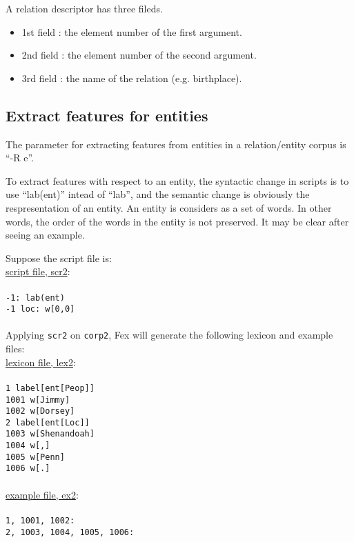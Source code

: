 \documentclass[11pt]{article}
\begin{document}
A relation descriptor has three fileds.
\begin{itemize}
  \item 1st field : the element number of the first argument.
  \item 2nd field : the element number of the second argument.
  \item 3rd field : the name of the relation (e.g. birthplace).
\end{itemize}

\subsection*{Extract features for entities}

The parameter for extracting features from entities in a relation/entity corpus is ``-R e''.

To extract features with respect to an entity, the syntactic change in
scripts is to use ``lab(ent)'' intead of ``lab'', and 
the semantic change is obviously the respresentation of an entity.  An entity
is considers as a set of words.  In other words, the order of the words in
the entity is not preserved.  It may be clear after seeing an example.

Suppose the script file is: \\

\underline{script file, scr2}: \\ \\
{\tt -1: lab(ent) \\
-1 loc: w[0,0]} \\ \\

Applying {\tt scr2} on {\tt corp2}, Fex will generate the following
lexicon and example files: \\

\underline{lexicon file, lex2}: \\ \\
{\tt 1       label[ent[Peop]] \\
1001    w[Jimmy] \\
1002    w[Dorsey] \\
2       label[ent[Loc]] \\
1003    w[Shenandoah] \\
1004    w[,] \\
1005    w[Penn] \\
1006    w[.]} \\ \\

\underline{example file, ex2}: \\ \\
{\tt 1, 1001, 1002: \\
2, 1003, 1004, 1005, 1006:} \\ 
\end{document}
